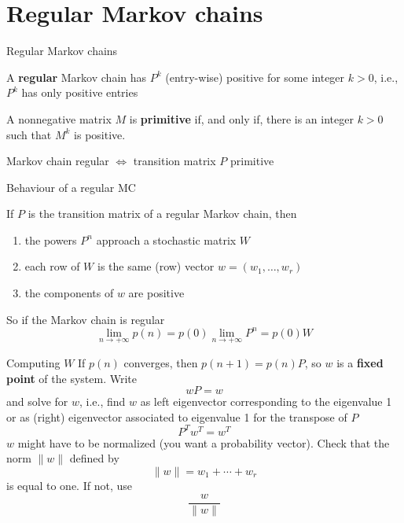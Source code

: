 \documentclass[aspectratio=43]{beamer}
\begin{document}
\section{Regular Markov chains}
\begin{frame}{Regular Markov chains}
\begin{definition}
A \textbf{regular} Markov chain has $P^k$ (entry-wise) positive for some integer $k>0$, i.e., $P^k$ has only positive entries
\end{definition}
\vfill
\begin{definition}
A nonnegative matrix $M$ is \textbf{primitive} if, and only if, there is an integer $k>0$ such that $M^k$ is positive.
\end{definition}
\vfill
\begin{theorem}
Markov chain regular $\iff$ transition matrix $P$ primitive
\end{theorem}
\end{frame}

\begin{frame}{Behaviour of a regular MC}
\begin{theorem}
If $P$ is the transition matrix of a regular Markov chain, then
\begin{enumerate}
\item the powers $P^n$ approach a stochastic matrix $W$
\item each row of $W$ is the same (row) vector $w=(w_1,\ldots,w_r)$
\item the components of $w$ are positive
\end{enumerate}
\end{theorem}
\vfill
So if the Markov chain is regular
\[
\lim_{n\rightarrow +\infty}p(n)=p(0)\lim_{n\rightarrow +\infty}P^n
=p(0)W
\]
\end{frame}


\begin{frame}{Computing $W$}
If $p(n)$ converges, then $p(n+1)=p(n)P$, so $w$ is a \textbf{fixed point} of the system. Write
\[
wP=w
\]
and solve for $w$, i.e., find $w$ as left eigenvector corresponding to the eigenvalue 1
or as (right) eigenvector associated to eigenvalue 1 for the transpose of $P$
\[
P^Tw^T=w^T
\]
\vfill
$w$ might have to be normalized (you want a probability vector). Check that the norm $\|w\|$ defined by
\[
\|w\|=w_1+\cdots+w_r
\]
is equal to one. If not, use
\[
\frac{w}{\|w\|}
\]
\end{frame}
\end{document}
